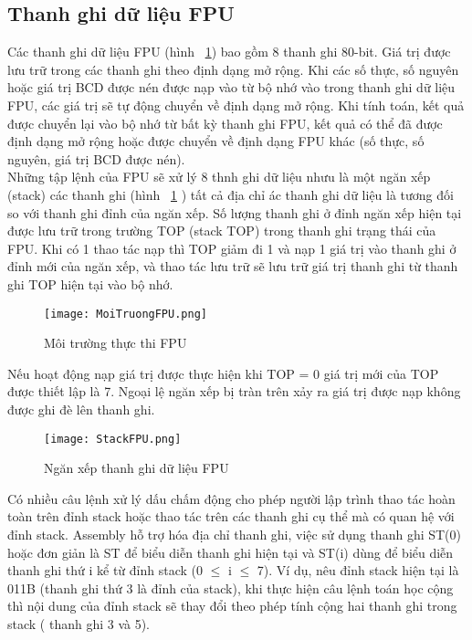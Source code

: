 		\subsection*{Thanh ghi dữ liệu FPU}
	Các thanh ghi dữ liệu FPU (hình ~\ref{fig:MoiTruongFPU}) bao gồm 8 thanh ghi 80-bit. Giá trị được lưu trữ trong các thanh ghi theo định dạng mở rộng. Khi các số thực, số nguyên hoặc giá trị BCD được nén được nạp vào từ bộ nhớ vào trong thanh ghi dữ liệu FPU, các giá trị sẽ tự động chuyển về định dạng mở rộng. Khi tính toán, kết quả được chuyển lại vào bộ nhớ từ bất kỳ thanh ghi FPU, kết quả có thể đã được định dạng mở rộng hoặc được chuyển về định dạng FPU khác (số thực, số nguyên, giá trị BCD được nén).\\

	Những tập lệnh của FPU sẽ xử lý 8 thnh ghi dữ liệu nhưu là một ngăn xếp (stack) các thanh ghi (hình ~\ref{fig:MoiTruongFPU} ) tất cả địa chỉ ác thanh ghi dữ liệu là tương đối so với thanh ghi đỉnh của ngăn xếp. Số lượng thanh ghi ở đỉnh ngăn xếp hiện tại được lưu trữ trong trường TOP (stack TOP) trong thanh ghi trạng thái của FPU. Khi có 1 thao tác nạp thì TOP giảm đi 1 và nạp 1 giá trị vào thanh ghi ở đỉnh mới của ngăn xếp, và thao tác lưu trữ sẽ lưu trữ giá trị thanh ghi từ thanh ghi TOP hiện tại vào bộ nhớ.
		\begin{center}
			\begin{figure}[htp]
				\begin{center}
					\texttt{[image: MoiTruongFPU.png]}
				\end{center}
				\caption{Môi trường thực thi FPU}				
				\label{fig:MoiTruongFPU}				
			\end{figure}
		\end{center}		
		
	Nếu hoạt động nạp giá trị được thực hiện khi TOP = 0 giá trị mới của TOP được thiết lập là 7. Ngoại lệ ngăn xếp bị tràn trên xảy ra giá trị được nạp không được ghi đè lên thanh ghi.			
			\begin{center}
			\begin{figure}[htp]
				\begin{center}
					\texttt{[image: StackFPU.png]}
				\end{center}
				\caption{Ngăn xếp thanh ghi dữ liệu FPU}				
				\label{fig:StackFPU}				
			\end{figure}
		\end{center}		
			
			Có nhiều câu lệnh xử lý dấu chấm động cho phép người lập trình thao tác hoàn toàn trên đỉnh stack hoặc thao tác trên các thanh ghi cụ thể mà có quan hệ với đỉnh stack. Assembly hỗ trợ hóa địa chỉ thanh ghi, việc sử dụng thanh ghi ST(0) hoặc đơn giản là ST để biểu diễn thanh ghi hiện tại và ST(i) dùng để biểu diễn thanh ghi thứ i kể từ đỉnh stack (0 $\mathbb{\le}$ i  $\mathbb{\le}$ 7). Ví dụ, nêu đỉnh stack hiện tại là 011B (thanh ghi thứ 3 là đỉnh của stack), khi thực hiện câu lệnh toán học cộng thì nội dung của đỉnh stack sẽ thay đổi theo phép tính cộng hai thanh ghi trong stack ( thanh ghi 3 và 5).
			
